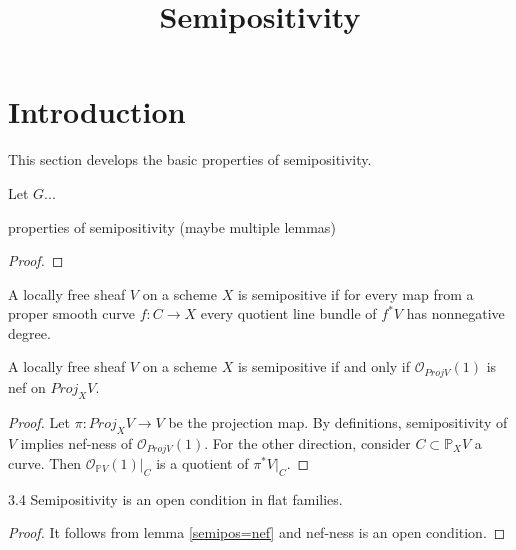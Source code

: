 


\newcommand{\todo}[1]{\footnote{\textbf{TODO.} #1}}

\title{Semipositivity}
\maketitle

\section{Introduction}
This section develops the basic properties of semipositivity.


\begin{definition}
Let $G$...
\end{definition}

\begin{lemma}
properties of semipositivity (maybe multiple lemmas)
\end{lemma}


\begin{proof}

\end{proof}


\begin{definition}
A locally free sheaf $V$ on a scheme $X$ is semipositive if for every map from a proper smooth curve $f:C\to X$ every quotient line bundle of $f^*V$ has nonnegative degree.
\end{definition}

\begin{lemma}\label{semipos=nef}
A locally free sheaf $V$ on a scheme $X$ is semipositive if and only if $\mathcal{O}_{Proj V}(1)$ is nef on $Proj_XV$.
\end{lemma}
\begin{proof}
Let $\pi: Proj_X V\to V$ be the projection map. By definitions, semipositivity of $V$ implies nef-ness of $\mathcal{O}_{Proj V}(1)$. For the other direction, consider $C\subset \mathbb{P}_XV$ a curve. Then $\mathcal{O}_{\mathbb{P}V}(1)|_C$ is a quotient of $\pi^*V|_C$. 
\end{proof}

\begin{lemma}
3.4 Semipositivity is an open condition in flat families.
\end{lemma}
\begin{proof}
It follows from lemma \ref{semipos=nef} and nef-ness is an open condition.
\end{proof}

